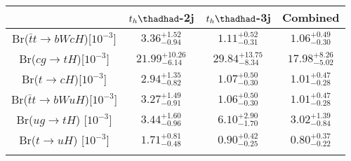 \centering
\begin{tabular}{cccc} \toprule\toprule
 & $t_h\thadhad$-2j & $t_h\thadhad$-3j & Combined\\\midrule

Br($\bar{t}t\to bWcH$)[$10^{-3}$]    & $3.36^{+1.52}_{-0.94}$ & $1.11^{+0.52}_{-0.31}$ & $1.06^{+0.49}_{-0.30}$\\
Br($cg\to tH$)[$10^{-3}]$            & $21.99^{+10.26}_{-6.14}$ & $29.84^{+13.75}_{-8.34}$ & $17.98^{+8.26}_{-5.02}$\\
Br($t\to cH$)[$10^{-3}$]             & $2.94^{+1.35}_{-0.82}$ & $1.07^{+0.50}_{-0.30}$ & $1.01^{+0.47}_{-0.28}$\\
Br($\bar{t}t\to bWuH$)[$10^{-3}$]    & $3.27^{+1.49}_{-0.91}$ & $1.06^{+0.50}_{-0.30}$ & $1.01^{+0.47}_{-0.28}$\\
Br($ug\to tH$) [$10^{-3}$]           & $3.44^{+1.60}_{-0.96}$ & $6.10^{+2.90}_{-1.70}$ & $3.02^{+1.39}_{-0.84}$\\
Br($t\to uH$)  [$10^{-3}$]           & $1.71^{+0.81}_{-0.48}$ & $0.90^{+0.42}_{-0.25}$ & $0.80^{+0.37}_{-0.22}$\\
\bottomrule\bottomrule\\
\end{tabular}




